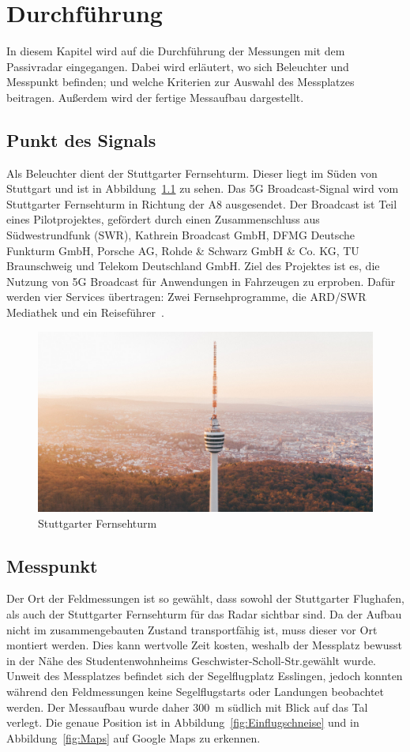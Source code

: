\chapter{Durchführung}
In diesem Kapitel wird auf die Durchführung der Messungen mit dem Passivradar eingegangen. Dabei wird erläutert, wo sich Beleuchter und Messpunkt befinden; und welche Kriterien zur Auswahl des Messplatzes beitragen. Außerdem wird der fertige Messaufbau dargestellt.
\section{Punkt des Signals}
Als Beleuchter dient der Stuttgarter Fernsehturm. Dieser liegt im Süden von Stuttgart und ist in Abbildung~\ref{fig:Fernsehturm} zu sehen. Das 5G Broadcast-Signal wird vom Stuttgarter Fernsehturm in Richtung der A8 ausgesendet. Der Broadcast ist Teil eines Pilotprojektes, gefördert durch einen Zusammenschluss aus Südwestrundfunk (SWR), Kathrein Broadcast GmbH,  DFMG  Deutsche Funkturm GmbH, Porsche AG, Rohde \& Schwarz GmbH \& Co. KG, TU Braunschweig und Telekom Deutschland GmbH. Ziel des Projektes ist es, die Nutzung von 5G Broadcast für Anwendungen in Fahrzeugen zu erproben. Dafür werden vier Services übertragen: Zwei Fernsehprogramme, die ARD/SWR Mediathek und ein Reiseführer~\cite{5GMAG2020}.
\begin{figure}
    \centering
    \includegraphics[width=\textwidth]{images/Fernsehturm.jpg}
    \caption{Stuttgarter Fernsehturm}\label{fig:Fernsehturm}
\end{figure}

\section{Messpunkt}
Der Ort der Feldmessungen ist so gewählt, dass sowohl der Stuttgarter Flughafen, als auch der Stuttgarter Fernsehturm für das Radar sichtbar sind. Da der Aufbau nicht im zusammengebauten Zustand transportfähig ist, muss dieser vor Ort montiert werden. Dies kann wertvolle Zeit kosten, weshalb der Messplatz bewusst in der Nähe des Studentenwohnheims Geschwister-Scholl-Str.\@ gewählt wurde. Unweit des Messplatzes befindet sich der Segelflugplatz Esslingen, jedoch konnten während den Feldmessungen keine Segelflugstarts oder Landungen beobachtet werden. Der Messaufbau wurde daher \SI{300}{\metre} südlich mit Blick auf das Tal verlegt. Die genaue Position ist in Abbildung~\ref{fig:Einflugschneise} und in Abbildung~\ref{fig:Maps} auf Google Maps zu erkennen.


